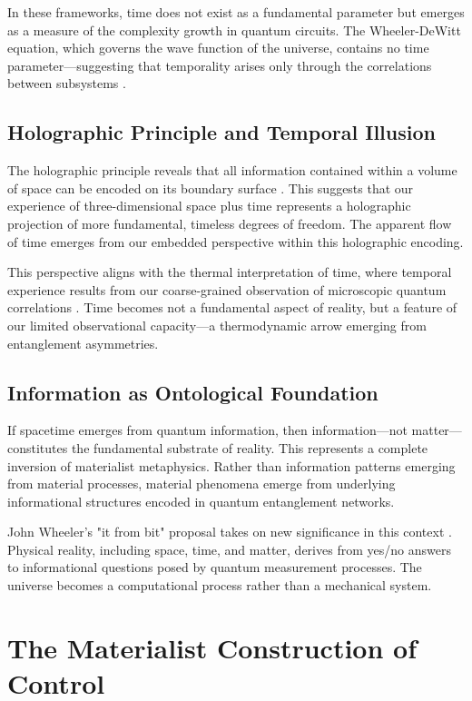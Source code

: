 \documentclass[12pt]{article}
\begin{document}
In these frameworks, time does not exist as a fundamental parameter but emerges as a measure of the complexity growth in quantum circuits. The Wheeler-DeWitt equation, which governs the wave function of the universe, contains no time parameter—suggesting that temporality arises only through the correlations between subsystems \cite{DeWitt1967}.

\subsection{Holographic Principle and Temporal Illusion}

The holographic principle reveals that all information contained within a volume of space can be encoded on its boundary surface \cite{Susskind1995}. This suggests that our experience of three-dimensional space plus time represents a holographic projection of more fundamental, timeless degrees of freedom. The apparent flow of time emerges from our embedded perspective within this holographic encoding.

This perspective aligns with the thermal interpretation of time, where temporal experience results from our coarse-grained observation of microscopic quantum correlations \cite{Rovelli2018}. Time becomes not a fundamental aspect of reality, but a feature of our limited observational capacity—a thermodynamic arrow emerging from entanglement asymmetries.

\subsection{Information as Ontological Foundation}

If spacetime emerges from quantum information, then information—not matter—constitutes the fundamental substrate of reality. This represents a complete inversion of materialist metaphysics. Rather than information patterns emerging from material processes, material phenomena emerge from underlying informational structures encoded in quantum entanglement networks.

John Wheeler's "it from bit" proposal takes on new significance in this context \cite{Wheeler1989}. Physical reality, including space, time, and matter, derives from yes/no answers to informational questions posed by quantum measurement processes. The universe becomes a computational process rather than a mechanical system.

\section{The Materialist Construction of Control}
\end{document}

